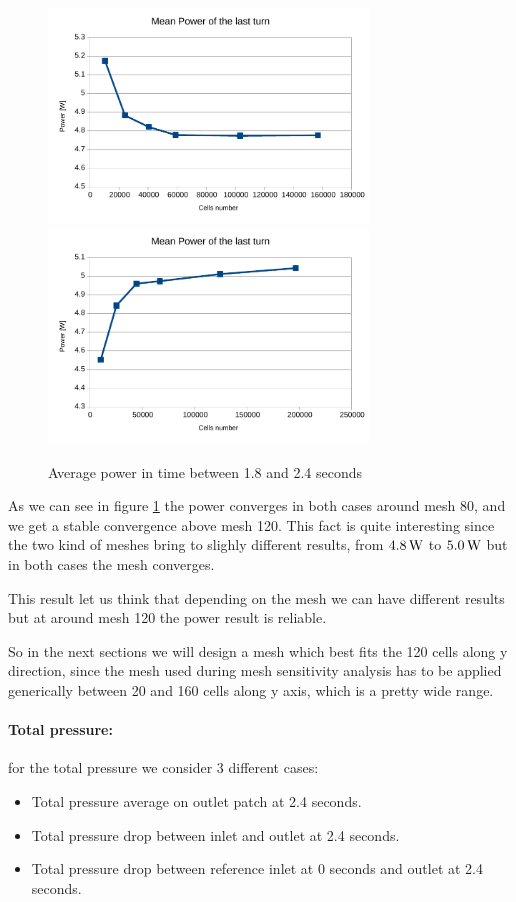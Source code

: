 \documentclass[a4paper,12pt]{article}
\begin{document}
\begin{figure}[htbp]
\centering
\includegraphics[width=8.5cm]{images/meshsensitivity/power-noregion} 
\includegraphics[width=8.5cm]{images/meshsensitivity/power-region} 
\caption{Average power in time between 1.8 and 2.4 seconds}
\label{fig:meshsensityvity-power}
\end{figure}

As we can see in figure \ref{fig:meshsensityvity-power} the power converges in both cases around mesh 80, and we get a stable convergence above mesh 120.
This fact is quite interesting since the two kind of meshes bring to slighly different results, from $4.8 \,\text{W}$ to $5.0 \,\text{W}$ but in both cases the mesh converges.

This result let us think that depending on the mesh we can have different results but at around mesh 120 the power result is reliable.

So in the next sections we will design a mesh which best fits the 120 cells along y direction, since the mesh used during mesh sensitivity analysis has to be applied generically between 20 and 160 cells along y axis, which is a pretty wide range.

\paragraph{Total pressure:} for the total pressure we consider 3 different cases:
\begin{itemize}
\item Total pressure average on outlet patch at 2.4 seconds.
\item Total pressure drop between inlet and outlet at 2.4 seconds.
\item Total pressure drop between reference inlet at 0 seconds and outlet at 2.4 seconds.
\end{itemize}
\end{document}
